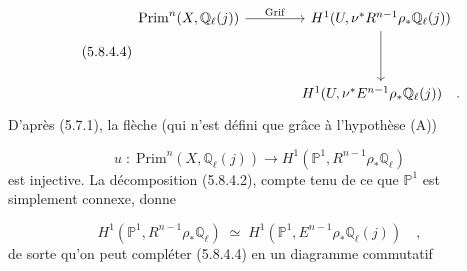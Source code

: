 \begin{equation}\tag{5.8.4.4}
\begin{tikzcd}[row sep=huge, column sep=large]
\mathrm{Prim}^n(X,\mathbb{Q}_\ell(j)) \arrow[r, "\mathrm{Grif}"] & H^1(U,\nu^*R^{n-1}\rho_*\mathbb{Q}_\ell(j)) \arrow[d] \\
 {} & H^1(U,\nu^*E^{n-1}\rho_*\mathbb{Q}_\ell(j)) \quad .
\end{tikzcd}
\end{equation}
D'après (5.7.1), la flèche (qui n'est défini que grâce à l'hypothèse (A))

\begin{equation}\tag{5.8.4.5}
u \;:\; \mathrm{Prim}^n(X,\mathbb{Q}_\ell(j)) \longrightarrow H^1(\mathbb{P}^1,R^{n-1}\rho_*\mathbb{Q}_\ell)
\end{equation}
est injective. La décomposition (5.8.4.2), compte tenu de ce que $\mathbb{P}^1$ est simplement connexe, donne

\begin{equation}\tag{5.8.4.6}
H^1(\mathbb{P}^1,R^{n-1}\rho_*\mathbb{Q}_\ell) \;\simeq\; H^1(\mathbb{P}^1,E^{n-1}\rho_*\mathbb{Q}_\ell(j)) \quad ,
\end{equation}
de sorte qu'on peut compléter (5.8.4.4) en un diagramme commutatif 



